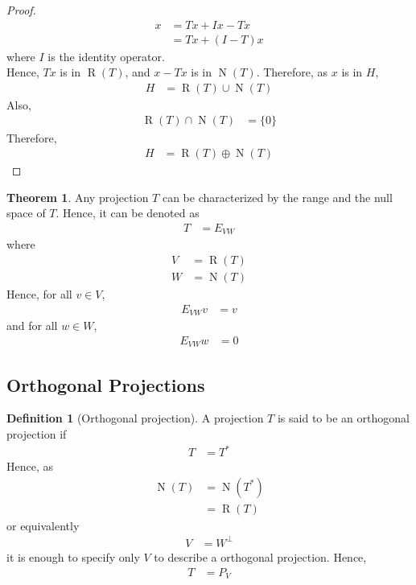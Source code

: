 \documentclass[titlepage, fleqn, a4paper, 12pt, twoside]{article}
\theoremstyle{definition}
\newtheorem{definition}{Definition}
\theoremstyle{theorem}
\newtheorem{theorem}{Theorem}
\DeclareMathOperator{\nullspace}{\mathrm{N}}
\DeclareMathOperator{\range}{\mathrm{R}}
\begin{document}
\begin{proof}
	\begin{align*}
		x &= T x + I x - T x\\
		&= T x + (I - T) x
	\end{align*}
	where $I$ is the identity operator.\\
	Hence, $T x$ is in $\range(T)$, and $x - T x$ is in $\nullspace(T)$.
	Therefore, as $x$ is in $H$,
	\begin{align*}
		H &= \range(T) \cup \nullspace(T)
	\end{align*}
	Also,
	\begin{align*}
		\range(T) \cap \nullspace(T) &= \{0\}
	\end{align*}
	Therefore,
	\begin{align*}
		H &= \range(T) \oplus \nullspace(T)
	\end{align*}
\end{proof}

\begin{theorem}
	Any projection $T$ can be characterized by the range and the null space of $T$.
	Hence, it can be denoted as
	\begin{align*}
		T &= E_{V W}
	\end{align*}
	where
	\begin{align*}
		V &= \range(T)\\
		W &= \nullspace(T)
	\end{align*}
	Hence, for all $v \in V$,
	\begin{align*}
		E_{V W} v &= v
	\end{align*}
	and for all $w \in W$,
	\begin{align*}
		E_{V W} w &= 0
	\end{align*}
\end{theorem}

\subsection{Orthogonal Projections}

\begin{definition}[Orthogonal projection]
	A projection $T$ is said to be an orthogonal projection if
	\begin{align*}
		T &= T^*
	\end{align*}
	Hence, as
	\begin{align*}
		\nullspace(T) &= \nullspace\left( T^* \right)\\
		&= \range(T)
	\end{align*}
	or equivalently
	\begin{align*}
		V &= W^{\perp}
	\end{align*}
	it is enough to specify only $V$ to describe a orthogonal projection.
	Hence,
	\begin{align*}
		T &= P_V
	\end{align*}
\end{definition}
\end{document}
